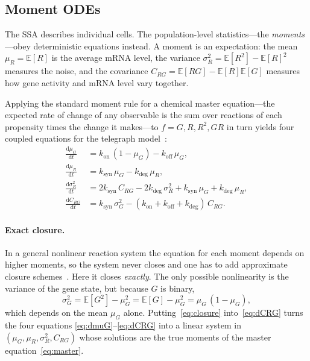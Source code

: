 \documentclass[11pt]{article}
\newcommand{\muG}{\mu_G}
\newcommand{\muR}{\mu_R}
\newcommand{\sigGsq}{\sigma_G^2}
\newcommand{\sigRsq}{\sigma_R^2}
\newcommand{\CRG}{C_{RG}}
\newcommand{\kon}{k_{\mathrm{on}}}
\newcommand{\koff}{k_{\mathrm{off}}}
\newcommand{\ksyn}{k_{\mathrm{syn}}}
\newcommand{\kdeg}{k_{\mathrm{deg}}}
\newcommand{\E}{\mathbb{E}}
\begin{document}
\subsection{Moment ODEs}
\label{sec:ode}

The SSA describes individual cells. The population-level statistics---the \emph{moments}---obey
deterministic equations instead.
A moment is an expectation: the mean $\muR=\E[R]$ is the average mRNA level, the variance
$\sigRsq=\E[R^2]-\E[R]^2$ measures the noise, and the covariance
$\CRG=\E[RG]-\E[R]\E[G]$ measures how gene activity and mRNA level vary together.

Applying the standard moment rule for a chemical master equation---the expected rate of
change of any observable is the sum over reactions of each propensity times the change it
makes---to $f=G,R,R^2,GR$ in turn yields four coupled equations for the telegraph
model~\cite{ingalls}:
\begin{align}
\label{eq:dmuG}
  \frac{\mathrm{d}\muG}{\mathrm{d}t} &= \kon\,(1-\muG) - \koff\,\muG , \\
\label{eq:dmuR}
  \frac{\mathrm{d}\muR}{\mathrm{d}t} &= \ksyn\,\muG - \kdeg\,\muR , \\
\label{eq:dsigR}
  \frac{\mathrm{d}\sigRsq}{\mathrm{d}t} &= 2\ksyn\,\CRG - 2\kdeg\,\sigRsq + \ksyn\,\muG + \kdeg\,\muR , \\
\label{eq:dCRG}
  \frac{\mathrm{d}\CRG}{\mathrm{d}t} &= \ksyn\,\sigGsq - (\kon+\koff+\kdeg)\,\CRG .
\end{align}

\paragraph{Exact closure.}
In a general nonlinear reaction system the equation for each moment depends on higher moments, so
the system never closes and one has to add approximate closure schemes~\cite{schnoerr2015,wilkinson}.
Here it closes \emph{exactly}. The only possible nonlinearity is the variance of the gene state,
but because $G$ is binary,
\begin{equation}
\label{eq:closure}
  \sigGsq = \E[G^2]-\muG^2 = \E[G]-\muG^2 = \muG\,(1-\muG),
\end{equation}
which depends on the mean $\muG$ alone. Putting~\eqref{eq:closure} into~\eqref{eq:dCRG} turns the
four equations \eqref{eq:dmuG}--\eqref{eq:dCRG} into a linear system in
$(\muG,\muR,\sigRsq,\CRG)$ whose solutions are the true moments of the master
equation~\eqref{eq:master}.
\end{document}

